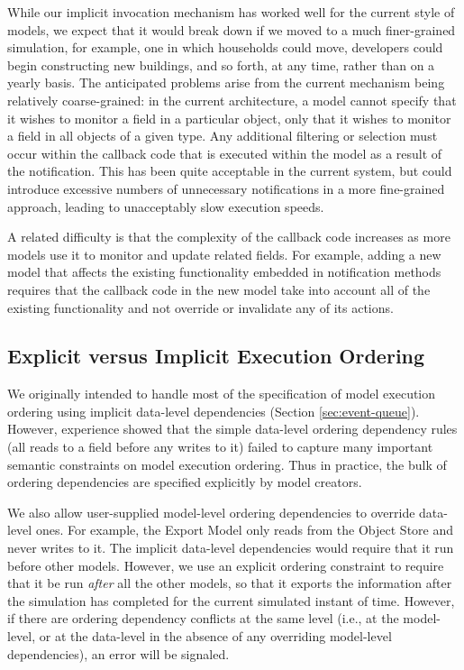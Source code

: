 While our implicit invocation mechanism has worked well for the current
style of models, we expect that it would break down if we moved to a much
finer-grained simulation, for example, one in which households could
move, developers could begin constructing new buildings, 
and so forth, at any
time, rather than on a yearly basis.  The anticipated problems arise from
the current mechanism being relatively coarse-grained: in the current
architecture, a model cannot specify that it wishes to monitor a field in a
particular object, only that it wishes to monitor a field in all objects of
a given type.  Any additional filtering or selection must occur within the
callback code that is executed within the model as a result of the
notification.  This has been quite acceptable in the current system, but
could introduce excessive numbers of unnecessary notifications in a more
fine-grained approach, leading to unacceptably slow execution speeds.

A related difficulty is that the complexity of the callback code increases
as more models use it to monitor and update related fields.  For example,
adding a new model that affects the existing functionality embedded in
notification methods requires that the callback code in the new model take
into account all of the existing functionality and not override or
invalidate any of its actions.

\subsection{Explicit versus Implicit Execution Ordering}

We originally intended to handle most of the specification of model
execution ordering using implicit data-level dependencies (Section
\ref{sec:event-queue}).  However, experience showed that the simple
data-level ordering dependency rules (all reads to a field before any
writes to it) failed to capture many important semantic constraints on
model execution ordering.  Thus in practice, the bulk of ordering
dependencies are specified explicitly by model creators.

We also allow user-supplied model-level ordering dependencies to override
data-level ones.  For example, the Export Model
only reads from the Object Store and never writes to it.  The
implicit data-level dependencies would require that it run before
other models.  However, we use an explicit ordering constraint to require
that it be run \emph{after} all the other models, so that it exports the
information after the simulation has completed for the current simulated
instant of time.  However, if there are ordering dependency conflicts at
the same level (i.e., at the model-level, or at the data-level in the
absence of any overriding model-level dependencies), an error will be
signaled.

